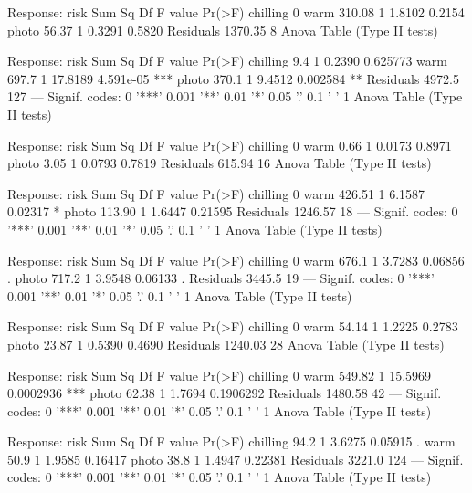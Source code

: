 \documentclass{article}\usepackage[]{graphicx}\usepackage[]{color}
\begin{document}
Response: risk
           Sum Sq Df F value Pr(>F)
chilling           0               
warm       310.08  1  1.8102 0.2154
photo       56.37  1  0.3291 0.5820
Residuals 1370.35  8               
Anova Table (Type II tests)

Response: risk
          Sum Sq  Df F value    Pr(>F)    
chilling     9.4   1  0.2390  0.625773    
warm       697.7   1 17.8189 4.591e-05 ***
photo      370.1   1  9.4512  0.002584 ** 
Residuals 4972.5 127                      
---
Signif. codes:  0 '***' 0.001 '**' 0.01 '*' 0.05 '.' 0.1 ' ' 1
Anova Table (Type II tests)

Response: risk
          Sum Sq Df F value Pr(>F)
chilling          0               
warm        0.66  1  0.0173 0.8971
photo       3.05  1  0.0793 0.7819
Residuals 615.94 16               
Anova Table (Type II tests)

Response: risk
           Sum Sq Df F value  Pr(>F)  
chilling           0                  
warm       426.51  1  6.1587 0.02317 *
photo      113.90  1  1.6447 0.21595  
Residuals 1246.57 18                  
---
Signif. codes:  0 '***' 0.001 '**' 0.01 '*' 0.05 '.' 0.1 ' ' 1
Anova Table (Type II tests)

Response: risk
          Sum Sq Df F value  Pr(>F)  
chilling          0                  
warm       676.1  1  3.7283 0.06856 .
photo      717.2  1  3.9548 0.06133 .
Residuals 3445.5 19                  
---
Signif. codes:  0 '***' 0.001 '**' 0.01 '*' 0.05 '.' 0.1 ' ' 1
Anova Table (Type II tests)

Response: risk
           Sum Sq Df F value Pr(>F)
chilling           0               
warm        54.14  1  1.2225 0.2783
photo       23.87  1  0.5390 0.4690
Residuals 1240.03 28               
Anova Table (Type II tests)

Response: risk
           Sum Sq Df F value    Pr(>F)    
chilling           0                      
warm       549.82  1 15.5969 0.0002936 ***
photo       62.38  1  1.7694 0.1906292    
Residuals 1480.58 42                      
---
Signif. codes:  0 '***' 0.001 '**' 0.01 '*' 0.05 '.' 0.1 ' ' 1
Anova Table (Type II tests)

Response: risk
          Sum Sq  Df F value  Pr(>F)  
chilling    94.2   1  3.6275 0.05915 .
warm        50.9   1  1.9585 0.16417  
photo       38.8   1  1.4947 0.22381  
Residuals 3221.0 124                  
---
Signif. codes:  0 '***' 0.001 '**' 0.01 '*' 0.05 '.' 0.1 ' ' 1
Anova Table (Type II tests)
\end{document}

